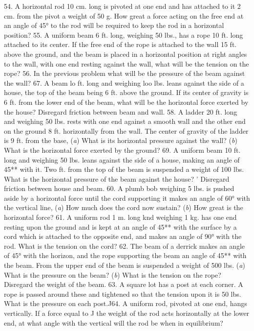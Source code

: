 54. A horizontal rod 10 cm. long is pivoted at one end and has attached to it 2 cm. from the pivot a weight of 50 g. How great a force acting on the free end at an angle of 45° to the rod will be required to keep the rod in a horizontal position?
55. A uniform beam 6 ft. long, weighing 50 lbs., has a rope 10 ft. long attached to its center. If the free end of the rope is attached to the wall 15 ft. above the ground, and the beam is placed in a horizontal position at right angles to the wall, with one end resting against the wall, what will be the tension on the rope?
56. In the previous problem what will be the pressure of the beam against the wall?
67. A beam lo ft. long and weighing loo lbs. leans against the side of a house, the top of the beam being 6 ft. above the ground. If its center of gravity is 6 ft. from the lower end of the beam, what will be the horizontal force exerted by the house? Disregard friction between beam and wall.
58. A ladder 20 ft. long and weighing 50 lbs. rests with one end against a smooth wall and the other end on the ground 8 ft. horizontally from the wall. The center of gravity of the ladder is 9 ft. from the base, (\emph{a}) What is its horizontal pressure against the wall? (\emph{b}) What is the horizontal force exerted by the ground?
69. A uniform beam 10 ft. long and weighing 50 lbs. leans against the side of a house, making an angle of 45** with it. Two ft. from the top of the beam is suspended a weight of 100 lbs. What is the horizontal pressure of the beam against the house? ' Disregard friction between house and beam.
60. A plumb bob weighing 5 lbs. is pushed aside by a horizontal force until the cord supporting it makes an angle of 60° with the vertical line, (\emph{a}) How much does the cord now sustain? (\emph{b}) How great is the horizontal force?
61. A uniform rod 1 m. long knd weighing 1 kg. has one end resting upon the ground and is kept at an angle of 45** with the surface by a cord which is attached to the opposite end, and makes an angle of 90° with the rod. What is the tension on the cord?
62. The beam of a derrick makes an angle of 45° with the horizon, and the rope supporting the beam an angle of 45** with the beam. From the upper end of the beam is suspended a weight of 500 lbs. (\emph{a}) What is the pressure on the beam? (\emph{b}) What is the tension on the rope? Disregard the weight of the beam.
63. A square lot has a post at each corner. A rope is passed around these and tightened so that the tension upon it is 50 lbs. What is the pressure on each post.^^
64. A uniform rod, pivoted at one end, hangs vertically. If a force equal to J the weight of the rod acts horizontally at the lower end, at what angle with the vertical will the rod be when in equilibrium?